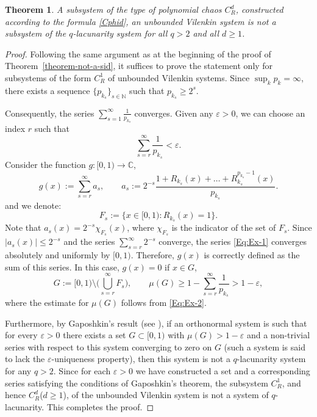 \documentclass[12pt]{article}
\newtheorem{theorem}{Theorem}  %
\begin{document}
	\begin{theorem} \label{theorem-not-q-lak}
	A subsystem of the type of polynomial chaos $C^d_R$, constructed according to the formula \eqref{Cphid}, an unbounded Vilenkin system is not a subsystem of the $q$-lacunarity system for all $q>2$ and all $d\ge 1$.
	\end{theorem}	
	\begin{proof} Following the same argument as at the beginning of the proof of Theorem~\ref{theorem-not-a-sid}, it suffices to prove the statement only for subsystems of the form $C^1_R$ of unbounded Vilenkin systems. Since $\sup_k p_k = \infty$, there exists a sequence $\{p_{k_s}\}_{s \in \mathbb{N}}$ such that $p_{k_s} \ge 2^s$.
		
Consequently, the series $\sum_{s=1}^{\infty} \frac{1}{p_{k_s}}$ converges. Given any $\varepsilon > 0$, we can choose an index $r$ such that
\begin{equation}
	\label{Eq:Ex-2}
	\sum_{s=r}^{\infty} \frac{1}{p_{k_s}} < \varepsilon.
\end{equation}
Consider the function $g \colon [0,1) \to \mathbb{C}$, 
		\begin{equation}
			\label{Eq:Ex-1} 
			g (x) 
			:= 
			\sum_{s=r}^{\infty} a_s, \qquad 
			a_s := 2^{-s} 
			\frac{ 1 + R_{k_s} (x) + \ldots + R_{k_s}^{p_{k_s}-1} (x)}{p_{k_s}}. 
		\end{equation}
		and we denote:
		\[
		F_s := \{x\in [0,1)\colon R_{k_s}(x) =1\}.
		\]
	Note that $a_s(x) = 2^{-s} \chi_{F_s}(x)$, where $\chi_{F_s}$ is the indicator of the set of $F_s$. 
	Since $|a_s(x)|\le 2^{-s}$ and the series $\sum_{s=r}^{\infty}2^{-s}$ converge,
	the series \eqref{Eq:Ex-1} converges absolutely and uniformly by $[0,1)$.
Therefore, $g(x)$ is correctly defined as the sum of this series.  
In this case, $g(x) = 0$ if $x \in G$, 
		\[ 
		G := 
		[ 0, 1 ) \setminus 
		\Big( 
		\bigcup_{s=r}^{\infty} 
		F_s
		\Big), \qquad \mu (G)  
		\ge 1 - \sum_{s=r}^{\infty} \frac{1}{p_{k_s}} > 1 - \varepsilon,
		\] 
		where the estimate for $\mu(G)$ follows from \eqref{Eq:Ex-2}.
		
		Furthermore, by Gaposhkin's result (see \cite[Ch.~1, \S~2]{Gaposhkin}), if an orthonormal system is such that for every $\varepsilon > 0$ there exists a set $G \subset [0,1)$ with $\mu(G) > 1 - \varepsilon$ and a non-trivial series with respect to this system converging to zero on $G$ (such a system is said to lack the $\varepsilon$-uniqueness property), then this system is not a $q$-lacunarity system for any $q>2$. Since for each $\varepsilon>0$ we have constructed a set and a corresponding series satisfying the conditions of Gaposhkin's theorem, the subsystem $C^1_R$, and hence $C^d_R$($d\ge 1$), of the unbounded Vilenkin system is not a system of $q$-lacunarity.
		This completes the proof. 
	\end{proof}
	
\end{document}
